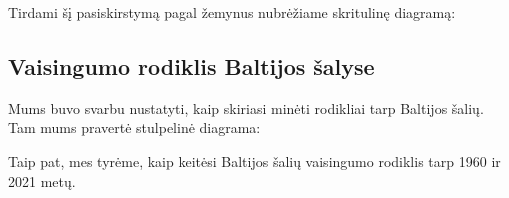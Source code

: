 Tirdami šį pasiskirstymą pagal žemynus nubrėžiame skritulinę diagramą:

\subsection{Vaisingumo rodiklis Baltijos šalyse}
Mums buvo svarbu nustatyti, kaip skiriasi minėti rodikliai tarp Baltijos šalių.
Tam mums pravertė stulpelinė diagrama:

Taip pat, mes tyrėme, kaip keitėsi Baltijos šalių vaisingumo rodiklis tarp 1960 ir 2021 metų.
